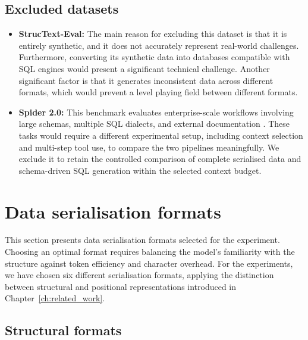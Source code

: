 \subsection{Excluded datasets}

\begin{itemize}
  \item \textbf{StrucText-Eval:} The main reason for excluding this dataset is that it is entirely synthetic,
    and it does not accurately represent real-world challenges. Furthermore, converting its synthetic data
    into databases compatible with SQL engines would present a significant technical challenge. Another
    significant factor is that it generates inconsistent data across different formats, which would prevent a
    level playing field between different formats.
  \item \textbf{Spider 2.0:} This benchmark evaluates enterprise-scale workflows involving large schemas,
    multiple SQL dialects, and external documentation \cite{lei2025spider}. These tasks would require a
    different experimental setup, including context selection and multi-step tool use, to compare the two
    pipelines meaningfully. We exclude it to retain the controlled comparison of complete serialised data and
    schema-driven SQL generation within the selected context budget.
\end{itemize}

\section{Data serialisation formats}

This section presents data serialisation formats selected for the experiment. Choosing an optimal format
requires balancing the model's familiarity with the structure against token efficiency and character
overhead. For the experiments, we have chosen six different serialisation formats, applying the distinction
between structural and positional representations introduced in Chapter~\ref{ch:related_work}.

\subsection{Structural formats}

